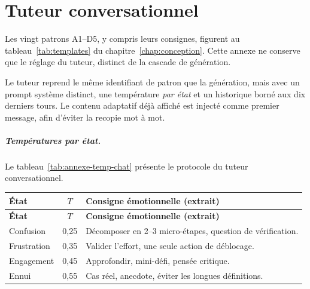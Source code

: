 
\chapter{Tuteur conversationnel}
\label{annexe:templates}

Les vingt patrons A1--D5, y compris leurs consignes, figurent au
tableau~\ref{tab:templates} du chapitre~\ref{chap:conception}. Cette
annexe ne conserve que le réglage du tuteur, distinct de la cascade
de génération.

Le tuteur reprend le même identifiant de patron que la génération, mais
avec un prompt système distinct, une température \emph{par état} et un
historique borné aux dix derniers tours. Le contenu adaptatif déjà
affiché est injecté comme premier message, afin d'éviter la recopie
mot à mot.

\paragraph{Températures par état.}
Le tableau~\ref{tab:annexe-temp-chat} présente le protocole du tuteur conversationnel.

{\small
\renewcommand{\arraystretch}{1.18}
\setlength{\tabcolsep}{4pt}
\begin{xltabular}{\textwidth}{|>{\raggedright\arraybackslash}X|c|l|}
\hline
{}
\textbf{État} & \textbf{$T$} & \textbf{Consigne émotionnelle (extrait)} \\
\hline
\endfirsthead
\hline
{}
\textbf{État} & \textbf{$T$} & \textbf{Consigne émotionnelle (extrait)} \\
\hline
\endhead
\endfoot
\endlastfoot
Confusion & 0{,}25 & Décomposer en 2--3 micro-étapes, question de vérification. \\
\hline
Frustration & 0{,}35 & Valider l'effort, une seule action de déblocage. \\
\hline
Engagement & 0{,}45 & Approfondir, mini-défi, pensée critique. \\
\hline
Ennui & 0{,}55 & Cas réel, anecdote, éviter les longues définitions. \\
\hline
\end{xltabular}
\label{tab:annexe-temp-chat}
}


